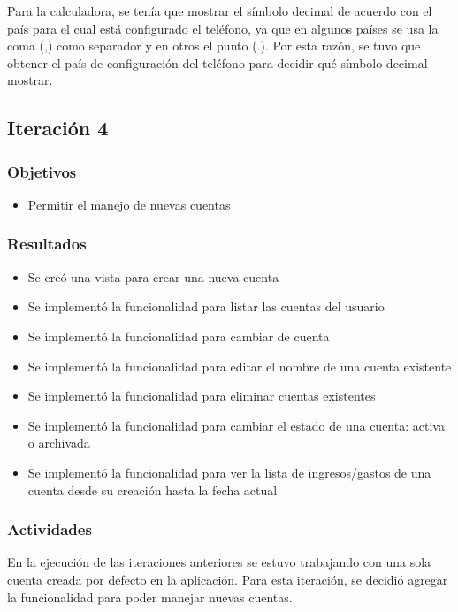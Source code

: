 Para la calculadora, se tenía que mostrar el símbolo decimal de acuerdo con el país para el cual está configurado el teléfono, ya que en algunos países se usa la coma (,) como separador y en otros el punto (.). Por esta razón, se tuvo que obtener el país de configuración del teléfono para decidir qué símbolo decimal mostrar.



\subsection{Iteración 4}
\subsubsection{Objetivos}
\begin{itemize}
\item Permitir el manejo de nuevas cuentas
\end{itemize}

\subsubsection{Resultados}
\begin{itemize}

\item Se creó una vista para crear una nueva cuenta
\item Se implementó la funcionalidad para listar las cuentas del usuario 
\item Se implementó la funcionalidad para cambiar de cuenta
\item Se implementó la funcionalidad para editar el nombre de una cuenta existente
\item Se implementó la funcionalidad para eliminar cuentas existentes
\item Se implementó la funcionalidad para cambiar el estado de una cuenta: activa o archivada
\item Se implementó la funcionalidad para ver la lista de ingresos/gastos de una cuenta desde su creación hasta la fecha actual

\end{itemize}

\subsubsection{Actividades}
En la ejecución de las iteraciones anteriores se estuvo trabajando con una sola cuenta creada por defecto en la aplicación. Para esta iteración, se decidió agregar la funcionalidad para poder manejar nuevas cuentas. 

